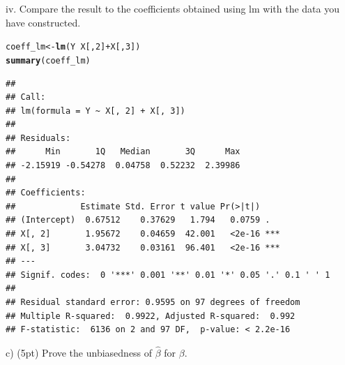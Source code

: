 \documentclass{article}\usepackage[]{graphicx}\usepackage[]{color}
\makeatletter
\newcommand{\hlnum}[1]{\textcolor[rgb]{0.686,0.059,0.569}{#1}}%
\newcommand{\hlopt}[1]{\textcolor[rgb]{0,0,0}{#1}}%
\newcommand{\hlstd}[1]{\textcolor[rgb]{0.345,0.345,0.345}{#1}}%
\newcommand{\hlkwb}[1]{\textcolor[rgb]{0.69,0.353,0.396}{#1}}%
\newcommand{\hlkwd}[1]{\textcolor[rgb]{0.737,0.353,0.396}{\textbf{#1}}}%
\newenvironment{kframe}{%
 \def\at@end@of@kframe{}%
 \ifinner\ifhmode%
  \def\at@end@of@kframe{\end{minipage}}%
  \begin{minipage}{\columnwidth}%
 \fi\fi%
 \def\FrameCommand##1{\hskip\@totalleftmargin \hskip-\fboxsep
 \colorbox{shadecolor}{##1}\hskip-\fboxsep
     \hskip-\linewidth \hskip-\@totalleftmargin \hskip\columnwidth}%
 \MakeFramed {\advance\hsize-\width
   \@totalleftmargin\z@ \linewidth\hsize
   \@setminipage}}%
 {\par\unskip\endMakeFramed%
 \at@end@of@kframe}
\newenvironment{knitrout}{}{} %
\makeatother
\begin{document}
iv. Compare the result to the coefficients obtained using lm with the data you have constructed.

\begin{knitrout}
\color{fgcolor}\begin{kframe}
\begin{alltt}
\hlstd{coeff_lm} \hlkwb{<-} \hlkwd{lm}\hlstd{(Y} \hlopt{~} \hlstd{X[,}\hlnum{2}\hlstd{]}\hlopt{+}\hlstd{X[,}\hlnum{3}\hlstd{])}
\hlkwd{summary}\hlstd{(coeff_lm)}
\end{alltt}
\begin{verbatim}
## 
## Call:
## lm(formula = Y ~ X[, 2] + X[, 3])
## 
## Residuals:
##      Min       1Q   Median       3Q      Max 
## -2.15919 -0.54278  0.04758  0.52232  2.39986 
## 
## Coefficients:
##             Estimate Std. Error t value Pr(>|t|)    
## (Intercept)  0.67512    0.37629   1.794   0.0759 .  
## X[, 2]       1.95672    0.04659  42.001   <2e-16 ***
## X[, 3]       3.04732    0.03161  96.401   <2e-16 ***
## ---
## Signif. codes:  0 '***' 0.001 '**' 0.01 '*' 0.05 '.' 0.1 ' ' 1
## 
## Residual standard error: 0.9595 on 97 degrees of freedom
## Multiple R-squared:  0.9922,	Adjusted R-squared:  0.992 
## F-statistic:  6136 on 2 and 97 DF,  p-value: < 2.2e-16
\end{verbatim}
\end{kframe}
\end{knitrout}

c) (5pt) Prove the unbiasedness of $\hat{\beta}$ for $\beta$.

\vspace*{0.5cm}
% 
% 
% 
% 
% 
% 
\end{document}
